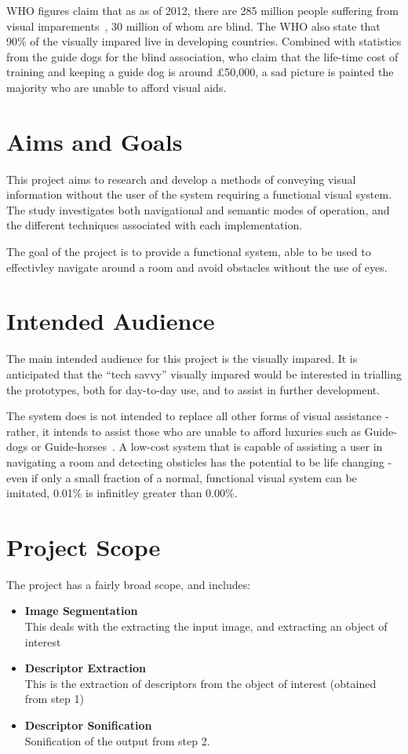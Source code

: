 \ac{WHO} figures claim that as as of 2012, there are 285 million people suffering from visual imparements~\cite{whoblindness}, 30 million of whom are blind. The \ac{WHO} also state that 90\% of the visually impared live in developing countries. Combined with statistics from the guide dogs for the blind association, who claim that the life-time cost of training and keeping a guide dog is around £50,000, a sad picture is painted the majority who are unable to afford visual aids.

\section{Aims and Goals}
This project aims to research and develop a methods of conveying visual information without the user of the system requiring a functional visual system. The study investigates both navigational and semantic modes of operation, and the different techniques associated with each implementation.

The goal of the project is to provide a functional system, able to be used to effectivley navigate around a room and avoid obstacles without the use of eyes.  

\section{Intended Audience}
The main intended audience for this project is the visually impared. It is anticipated that the ``tech savvy'' visually impared would be interested in trialling the prototypes, both for day-to-day use, and to assist in further development.

The system does is not intended to replace all other forms of visual assistance - rather, it intends to assist those who are unable to afford luxuries such as Guide-dogs or Guide-horses~\cite{guidehorse}. A low-cost system that is capable of assisting a user in navigating a room and detecting obsticles has the potential to be life changing - even if only a small fraction of a normal, functional visual system can be imitated, 0.01\% is infinitley greater than 0.00\%.

\section{Project Scope}
The project has a fairly broad scope, and includes:
\begin{itemize}
    \item \textbf{Image Segmentation} \hfill \\
        This deals with the extracting the input image, and extracting an object of interest
    \item \textbf{Descriptor Extraction} \hfill \\
        This is the extraction of descriptors from the object of interest (obtained from step 1)
    \item \textbf{Descriptor Sonification} \hfill \\
        Sonification of the output from step 2.
\end{itemize}

